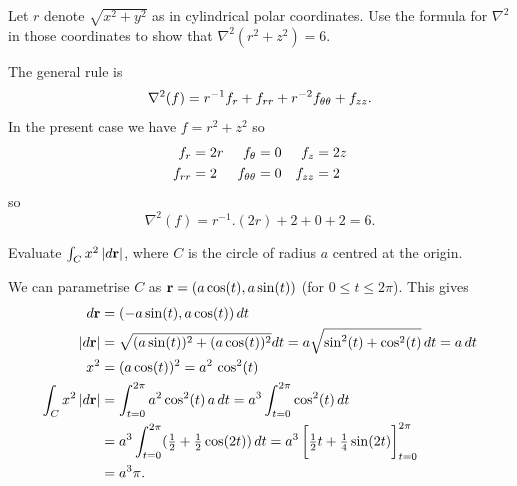 \documentclass[a4paper]{amsart}
\renewenvironment{solution}{\SolutionInline}{\endSolutionInline}
\begin{document}
\begin{exercise}
 Let $r$ denote $\sqrt{x^2+y^2}$ as in cylindrical polar coordinates.
 Use the formula for $\nabla^2$ in those coordinates to show that
 $\nabla^2(r^2+z^2)=6$. 
\end{exercise}
\begin{solution}
 The general rule is
 \[ \nabla^2(f) = r^{-1}f_r + f_{rr} + r^{-2}f_{\theta\theta} + f_{zz}.
 \] 
 In the present case we have $f=r^2+z^2$ so 
 \begin{align*}
  f_r    &= 2r & f_\theta       &= 0 & f_z    &= 2z \\
  f_{rr} &= 2  & f_{\theta\theta} &= 0 & f_{zz} &= 2
 \end{align*}
 so
 \[ \nabla^2(f) = r^{-1}.(2r) + 2 + 0 + 2 = 6. \]
\end{solution}

\begin{exercise}
 Evaluate $\int_Cx^2\,|d\mathbf{r}|$, where $C$ is the circle of radius $a$
 centred at the origin.
\end{exercise}
\begin{solution}
 We can parametrise $C$ as $\mathbf{r}=(a\cos(t),a\sin(t))$ (for
 $0\leq t\leq 2\pi$).  This gives
 \begin{align*}
  d\vr &= (-a\sin(t),a\cos(t))\,dt \\
  |d\vr| &= \sqrt{(a\sin(t))^2+(a\cos(t))^2} dt
          = a\sqrt{\sin^2(t)+\cos^2(t)}\,dt = a\,dt \\
  x^2 &= (a\cos(t))^2 = a^2\,\cos^2(t) \\
  \int_C x^2\,|d\vr| &= 
   \int_{t=0}^{2\pi} a^2\cos^2(t)\,a\,dt 
   = a^3 \int_{t=0}^{2\pi} \cos^2(t)\,dt \\
   &= a^3\int_{t=0}^{2\pi}(\half+\half\cos(2t))\,dt 
    = a^3\CH{\half t+\tfrac{1}{4}\sin(2t)}_{t=0}^{2\pi} \\
   &= a^3\pi.
 \end{align*}
\end{solution}
\end{document}
